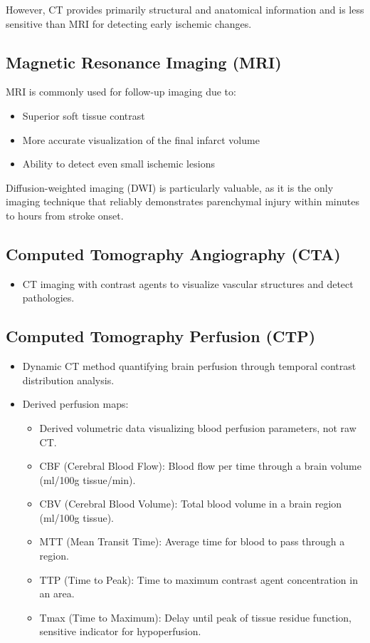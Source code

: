 However, CT provides primarily structural and anatomical information and is less sensitive than MRI for detecting early ischemic changes.

\subsection{Magnetic Resonance Imaging (MRI)}

MRI is commonly used for follow-up imaging due to:

\begin{itemize}
    \item Superior soft tissue contrast
    \item More accurate visualization of the final infarct volume
    \item Ability to detect even small ischemic lesions
\end{itemize}

Diffusion-weighted imaging (DWI) is particularly valuable, as it is the only imaging technique that reliably demonstrates parenchymal injury within minutes to hours from stroke onset.

\subsection{Computed Tomography Angiography (CTA)}
\begin{itemize}
    \item CT imaging with contrast agents to visualize vascular structures and detect pathologies.
\end{itemize}

\subsection{Computed Tomography Perfusion (CTP)}

\begin{itemize}
    \item Dynamic CT method quantifying brain perfusion through temporal contrast distribution analysis.
    \item Derived perfusion maps:
    \begin{itemize}
        \item Derived volumetric data visualizing blood perfusion parameters, not raw CT.
        \item CBF (Cerebral Blood Flow): Blood flow per time through a brain volume (ml/100g tissue/min).
        \item CBV (Cerebral Blood Volume): Total blood volume in a brain region (ml/100g tissue).
        \item MTT (Mean Transit Time): Average time for blood to pass through a region.
        \item TTP (Time to Peak): Time to maximum contrast agent concentration in an area.
        \item Tmax (Time to Maximum): Delay until peak of tissue residue function, sensitive indicator for hypoperfusion.
    \end{itemize}
\end{itemize}


